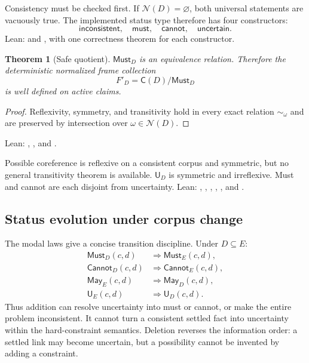 \documentclass[11pt]{article}
\newtheorem{theorem}{Theorem}[section]
\theoremstyle{definition}
\theoremstyle{remark}
\newcommand{\Feas}{\mathcal N}
\newcommand{\Claims}{\mathsf C}
\newcommand{\Must}{\mathsf{Must}}
\newcommand{\May}{\mathsf{May}}
\newcommand{\Cannot}{\mathsf{Cannot}}
\newcommand{\Uncertain}{\mathsf U}
\begin{document}
Consistency must be checked first.  If $\Feas(D)=\varnothing$, both universal
statements are vacuously true.  The implemented status type therefore has four
constructors:
\[
 \mathsf{inconsistent},\quad \mathsf{must},\quad
 \mathsf{cannot},\quad \mathsf{uncertain}.
\]
Lean:  and , with one
correctness theorem for each constructor.

\begin{theorem}[Safe quotient]
$\Must_D$ is an equivalence relation.  Therefore the deterministic normalized
frame collection
\[
  F'_D=\Claims(D)/\Must_D
\]
is well defined on active claims.
\end{theorem}
\begin{proof}
Reflexivity, symmetry, and transitivity hold in every exact relation
$\sim_\omega$ and are preserved by intersection over $\omega\in\Feas(D)$.
\end{proof}
\noindent Lean: ,
, and .

Possible coreference is reflexive on a consistent corpus and symmetric, but no
general transitivity theorem is available.  $\Uncertain_D$ is symmetric and
irreflexive.  Must and cannot are each disjoint from uncertainty.  Lean:
, ,
, ,
, and
.

\subsection{Status evolution under corpus change}

The modal laws give a concise transition discipline.  Under $D\subseteq E$:
\begin{align*}
 \Must_D(c,d)&\Longrightarrow\Must_E(c,d),\\
 \Cannot_D(c,d)&\Longrightarrow\Cannot_E(c,d),\\
 \May_E(c,d)&\Longrightarrow\May_D(c,d),\\
 \Uncertain_E(c,d)&\Longrightarrow\Uncertain_D(c,d).
\end{align*}
Thus addition can resolve uncertainty into must or cannot, or make the entire
problem inconsistent.  It cannot turn a consistent settled fact into
uncertainty within the hard-constraint semantics.  Deletion reverses the
information order: a settled link may become uncertain, but a possibility
cannot be invented by adding a constraint.
\end{document}
